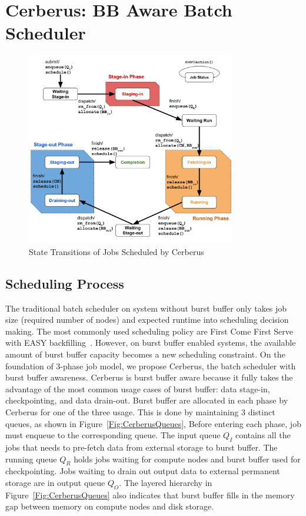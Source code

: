 \section{Cerberus: BB Aware Batch Scheduler}
\label{Sec:Scheduler}

\begin{figure}[htp]
\centering
        \includegraphics[width=3.6in]{3PhaseJobFSM}
        \caption{State Transitions of Jobs Scheduled by Cerberus}
\label{Fig:JobFSM}
\end{figure}

\subsection{Scheduling Process}

The traditional batch scheduler on system without burst buffer only
takes job size (required number of nodes) and expected runtime into scheduling decision making. 
The most commonly used scheduling policy are First Come First Serve with
EASY backfilling~\cite{tsafrir-tpds-2007}.
However, on burst buffer enabled systems, 
the available amount of burst buffer capacity becomes a new scheduling constraint.
On the foundation of 3-phase job model,
we propose Cerberus, the batch scheduler with burst buffer awareness.
Cerberus is burst buffer aware because it fully takes the advantage of the 
most common usage cases of burst buffer: data stage-in, checkpointing, and data drain-out.
Burst buffer are allocated in each phase by Cerberus for one of the three usage.
This is done by maintaining 3 distinct queues, as shown in Figure~\ref{Fig:CerberusQueues},
Before entering each phase, job must enqueue to the corresponding queue.
The input queue $Q_I$ contains all the jobs that
needs to pre-fetch data from external storage to burst buffer.
The running queue $Q_R$ holds jobs
waiting for compute nodes and burst buffer used for checkpointing.
Jobs waiting to drain out output data to external permanent storage are in output queue $Q_O$.
The layered hierarchy in Figure~\ref{Fig:CerberusQueues} also indicates that
burst buffer fills in the memory gap between memory on compute nodes and disk storage.

